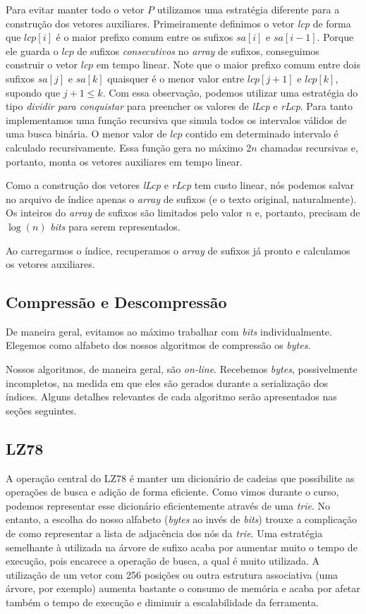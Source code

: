 \documentclass[]{article}
\begin{document}
Para evitar manter todo o vetor $P$ utilizamos uma estratégia diferente para a construção dos vetores auxiliares. Primeiramente definimos o vetor \textit{lcp} de forma que $lcp[i]$ é o maior prefixo comum entre os sufixos $sa[i]$ e $sa[i-1]$. Porque ele guarda o $lcp$ de sufixos \textit{consecutivos} no \textit{array} de sufixos, conseguimos construir o vetor $lcp$ em tempo linear. Note que o maior prefixo comum entre dois sufixos $sa[j]$ e $sa[k]$ quaisquer é o menor valor entre $lcp[j+1]$ e $lcp[k]$, supondo que $j+1 \leq k$. Com essa observação, podemos utilizar uma estratégia do tipo \textit{dividir para conquistar} para preencher os valores de \textit{lLcp} e \textit{rLcp}. Para tanto implementamos uma função recursiva que simula todos os intervalos válidos de uma busca binária. O menor valor de $lcp$ contido em determinado intervalo é calculado recursivamente. Essa função gera no máximo $2n$ chamadas recursivas e, portanto, monta os vetores auxiliares em tempo linear.

Como a construção dos vetores \textit{lLcp} e \textit{rLcp} tem custo linear, nós podemos salvar no arquivo de índice apenas o \textit{array} de sufixos (e o texto original, naturalmente). Os inteiros do \textit{array} de sufixos são limitados pelo valor $n$ e, portanto, precisam de $\log(n)$ \textit{bits} para serem representados. 

Ao carregarmos o índice, recuperamos o \textit{array} de sufixos já pronto e calculamos os vetores auxiliares.

\subsection{Compressão e Descompressão}

De maneira geral, evitamos ao máximo trabalhar com \textit{bits} individualmente. Elegemos como alfabeto dos nossos algoritmos de compressão os \textit{bytes}.

Nossos algoritmos, de maneira geral, são \textit{on-line}. Recebemos \textit{bytes}, possivelmente incompletos, na medida em que eles são gerados durante a serialização dos índices. Alguns detalhes relevantes de cada algoritmo serão apresentados nas seções seguintes.

\subsection{LZ78}

A operação central do LZ78 é manter um dicionário de cadeias que possibilite as operações de busca e adição de forma eficiente. Como vimos durante o curso, podemos representar esse dicionário eficientemente através de uma \textit{trie}. No entanto, a escolha do nosso alfabeto (\textit{bytes} ao invés de \textit{bits}) trouxe a complicação de como representar a lista de adjacência dos nós da \textit{trie}. Uma estratégia semelhante à utilizada na árvore de sufixo acaba por aumentar muito o tempo de execução, pois encarece a operação de busca, a qual é muito utilizada. A utilização de um vetor com 256 posições ou outra estrutura associativa (uma árvore, por exemplo) aumenta bastante o consumo de memória e acaba por afetar também o tempo de execução e diminuir a escalabilidade da ferramenta.
\end{document}
